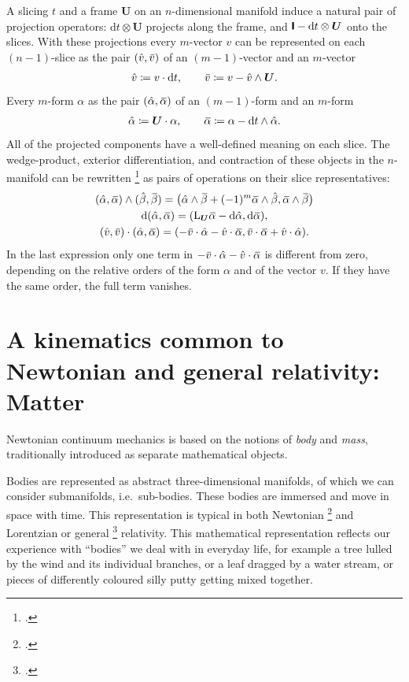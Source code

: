 \documentclass[\ifafour a4paper,12pt,\else a5paper,10pt,\fi%
onecolumn,oneside,article,%
british%
]{memoir}
\theoremstyle{remark}
\theoremstyle{innote}
\newcommand*{\citep}{\footcites}
\newcommand*{\di}{\mathrm{d}}%
\newcommand*{\defd}{\coloneqq}
\renewcommand*{\|}[1][]{\nonscript\,#1\vert\nonscript\;\mathopen{}}
\newcommand*{\sect}{\S}%
\newcommand*{\sects}{\S\S}%
\newcommand*{\ie}{{i.e.}}
\newcommand*{\widebar}[1]{{\mkern1.5mu\skew{2}\overline{\mkern-1.5mu#1\mkern-1.5mu}\mkern 1.5mu}}
\newcommand*{\Li}{\mathrm{L}}
\newcommand*{\yFF}{U}
\newcommand*{\yF}{\bm{\yFF}}
\newcommand*{\yI}{\textsf{\textbf{I}}}
\newcommand*{\yah}{\Hat{\alpha}}
\newcommand*{\yaw}{\widebar{\alpha}}
\newcommand*{\ybh}{\Hat{\beta}}
\newcommand*{\ybw}{\widebar{\beta}}
\newcommand*{\yvh}{\Hat{v}}
\newcommand*{\yvw}{\widebar{v}}
\begin{document}
A slicing $t$ and a frame $\yF$ on an $n$-dimensional manifold induce a
natural pair of projection operators: $\di t\otimes\yF$ projects along the
frame, and $\yI - \di t \otimes\yF$ onto the slices. With these projections
every $m$-vector $v$ can be represented on each $(n-1)$-slice as the pair
$(\yvh, \yvw)$ of an $(m-1)$-vector and an $m$-vector
\begin{equation}
  \label{eq:projection_vector}
  \yvh \defd v\cdot \di t,
  \qquad
  \yvw \defd v - \yvh\land \yF.
\end{equation}
Every $m$-form $\alpha$ as the pair $(\yah, \yaw)$ of an $(m-1)$-form and
an $m$-form
\begin{equation}
  \label{eq:projection_form}
  \yah \defd \yF \cdot \alpha,
  \qquad
  \yaw \defd \alpha - \di t \land \yah.
\end{equation}
All of the projected components have a well-defined meaning on each slice.
The wedge-product, exterior differentiation, and contraction of these
objects in the $n$-manifold can be rewritten
\citep[\sect~B.1.4]{hehletal2003} as pairs of operations on their slice
representatives:
\begin{gather}
  \label{eq:wedge_projection}
  (\yah, \yaw) \land (\ybh, \ybw) = \bigl(
  \yah \land \ybw +(-1)^m \yaw \land \ybh,
  \yaw \land \ybw \bigr)
  \\
  \label{eq:d_projection}
  \di(\yah, \yaw) = ( \Li_{\yF}\yaw - \di\yah, \di\yaw),
  \\
  \label{eq:contraction_projection}
  (\yvh, \yvw) \cdot (\yah, \yaw) =
  (-\yvw \cdot \yah-\yvh \cdot \yaw, \yvw \cdot \yaw + \yvh \cdot \yah).
\end{gather}
In the last expression only one term in $-\yvw \cdot \yah-\yvh \cdot \yaw$
is different from zero, depending on the relative orders of the form
$\alpha$ and of the vector $v$. If they have the same order, the full
term vanishes.

\section{A kinematics common to Newtonian and general relativity:\\
  Matter}
\label{sec:matter}


Newtonian continuum mechanics is based on the notions of \emph{body} and
\emph{mass}, traditionally introduced as separate mathematical objects.

Bodies are represented as abstract three-dimensional manifolds, of which we
can consider submanifolds, \ie\ sub-bodies. These bodies are immersed and
move in space with time. This representation is typical in both Newtonian
\citep[\sects~I.2--3]{truesdell1977_r1991}{noll1959,noll1973} and
Lorentzian or general \citep{grotetal1966,carteretal1972} relativity. This
mathematical representation reflects our experience with \enquote{bodies}
we deal with in everyday life, for example a tree lulled by the wind and
its individual branches, or a leaf dragged by a water stream, or pieces of
differently coloured silly putty getting mixed together.
\end{document}

